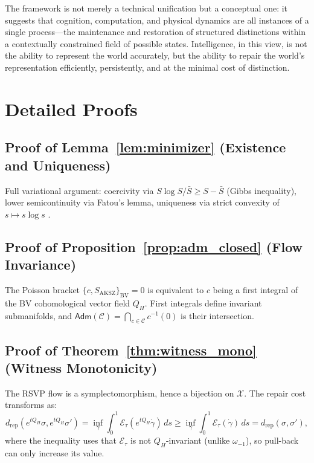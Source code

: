 \documentclass[a4paper,12pt]{article}
\theoremstyle{definition}
\newcommand{\Etau}{\mathcal{E}_\tau}
\newcommand{\X}{\mathcal{X}}
\newcommand{\Adm}{\mathsf{Adm}}
\newcommand{\dRP}{d_{\mathrm{rep}}}
\begin{document}
The framework is not merely a technical unification but a conceptual one: it suggests that cognition, computation, and physical dynamics are all instances of a single process—the maintenance and restoration of structured distinctions within a contextually constrained field of possible states. Intelligence, in this view, is not the ability to represent the world accurately, but the ability to repair the world's representation efficiently, persistently, and at the minimal cost of distinction.

\appendix

\section{Detailed Proofs}
\label{app:proofs}

\subsection{Proof of Lemma~\ref{lem:minimizer} (Existence and Uniqueness)}
Full variational argument: coercivity via $S \log S / \bar{S} \geq S - \bar{S}$ (Gibbs inequality), lower semicontinuity via Fatou's lemma, uniqueness via strict convexity of $s \mapsto s \log s$ \cite{Evans1998, Villani2008}.

\subsection{Proof of Proposition~\ref{prop:adm_closed} (Flow Invariance)}
The Poisson bracket $\{c, S_{\mathrm{AKSZ}}\}_{\mathrm{BV}} = 0$ is equivalent to $c$ being a first integral of the BV cohomological vector field $Q_H$. First integrals define invariant submanifolds, and $\Adm(\mathcal{C}) = \bigcap_{c \in \mathcal{C}} c^{-1}(0)$ is their intersection.

\subsection{Proof of Theorem~\ref{thm:witness_mono} (Witness Monotonicity)}
The RSVP flow is a symplectomorphism, hence a bijection on $\X$. The repair cost transforms as:
\[
\dRP(e^{tQ_H}\sigma, e^{tQ_H}\sigma') = \inf_\gamma \int_0^1 \Etau(e^{tQ_H}\dot\gamma) \, ds \geq \inf_\gamma \int_0^1 \Etau(\dot\gamma) \, ds = \dRP(\sigma, \sigma'),
\]
where the inequality uses that $\Etau$ is not $Q_H$-invariant (unlike $\omega_{-1}$), so pull-back can only increase its value.
\end{document}
